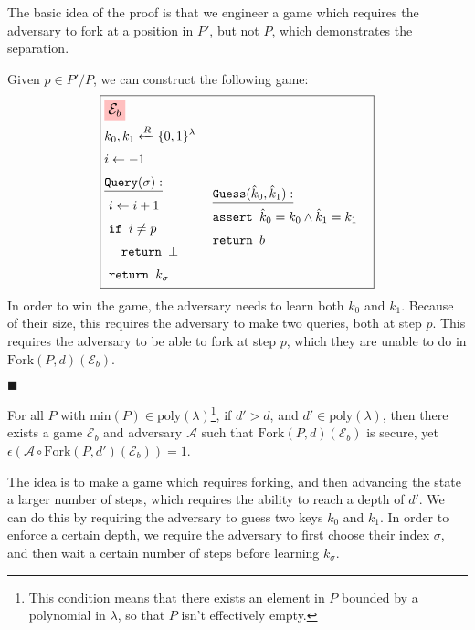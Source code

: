 The basic idea of the proof is that we engineer a game which requires
the adversary to fork at a position in $P'$, but not $P$, which demonstrates
the separation.

Given $p \in P' / P$, we can construct the following game:
$$
\boxed{
\begin{aligned}
&\colorbox{pink}{\large $\mathcal{E}_b$}\cr
&k_0, k_1 \xleftarrow{R} \{0, 1\}^\lambda\cr
&i \gets -1\cr
&\begin{aligned}
    &\underline{\texttt{Query}(\sigma):}\cr
    &\ i \gets i + 1\cr
    &\ \texttt{if } i \neq p\cr
    &\ \quad \texttt{return } \bot\cr
    &\ \texttt{return } k_\sigma\cr
\end{aligned}
&\begin{aligned}
    &\ \underline{\texttt{Guess}(\hat{k}_0, \hat{k}_1):}\cr
    &\ \texttt{assert } \hat{k}_0 = k_0 \land \hat{k}_1 = k_1\cr
    &\ \texttt{return } b\cr
    &\cr
\end{aligned}\cr
\end{aligned}
}
$$
In order to win the game, the adversary needs to learn both $k_0$
and $k_1$.
Because of their size, this requires the adversary to make two
queries, both at step $p$.
This requires the adversary to be able to fork at step $p$,
which they are unable to do in $\text{Fork}(P, d)(\mathcal{E}_b)$.

$\blacksquare$

\begin{claim}
    \label{claim:P-is-stronger}
    For all $P$ with $\text{min}(P) \in \text{poly}(\lambda)$\footnote{This condition means that there exists an element in $P$ bounded by a polynomial in $\lambda$, so that $P$ isn't effectively empty.},
    if $d' > d$, and ${d' \in \text{poly}(\lambda)}$, then there exists a
    game $\mathcal{E}_b$ and adversary $\mathcal{A}$ such that 
    $\text{Fork}(P, d)(\mathcal{E}_b)$ is secure, yet ${\epsilon(\mathcal{A} \circ \text{Fork}(P, d')(\mathcal{E}_b)) = 1}$.
\end{claim}

The idea is to make a game which requires forking, and then advancing
the state a larger number of steps, which requires the ability to
reach a depth of $d'$.
We can do this by requiring the adversary to guess two keys $k_0$ and $k_1$.
In order to enforce a certain depth, we require the adversary to first
choose their index $\sigma$, and then wait a certain number of steps
before learning $k_\sigma$.

